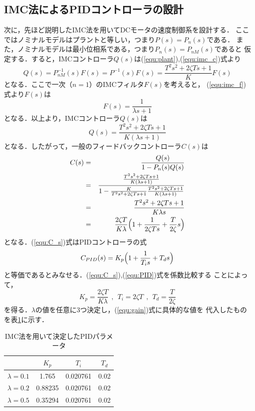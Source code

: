\documentclass[a4paper,12pt]{jarticle}
\begin{document}
\subsection{IMC法によるPIDコントローラの設計}
次に，先ほど説明したIMC法を用いてDCモータの速度制御系を設計する．
ここではノミナルモデルはプラントと等しい，つまり$P(s)=P_{n}(s)$である．
また，ノミナルモデルは最小位相系である，つまり$P_n(s)=P_{nM}(s)$であると
仮定する．すると，IMCコントローラ$Q(s)$は(\ref{equ:plant}),(\ref{equ:imc_c})式より
%
\begin{equation}
 Q(s) = P_{nM}^{-1}(s)F(s) = P^{-1}(s)F(s) = \frac{T^2s^2+2\zeta Ts+1}{K}F(s) 
\end{equation}
%
となる．ここで一次（$n=1$）のIMCフィルタ$F(s)$を考えると，
(\ref{equ:imc_f})式より$F(s)$は
%
\begin{equation}
 F(s) = \frac{1}{\lambda s + 1}
\end{equation}
%
となる．以上より，IMCコントローラ$Q(s)$は
%
\begin{equation}
 Q(s) = \frac{T^2s^2+2\zeta Ts+1}{K(\lambda s + 1)}
\end{equation}
%
となる．したがって，一般のフィードバックコントローラ$C(s)$は
%
\begin{eqnarray}\label{equ:C_s}
 C(s) & = & \frac{Q(s)}{1 - P_n(s)Q(s)} \nonumber  \\ 
  & = & \frac{\frac{T^2s^2+2\zeta Ts+1}{K(\lambda s +
  1)}}{1-\frac{K}{T^2s^2+2\zeta Ts+1}\frac{T^2s^2+2\zeta Ts+1}{K(\lambda
  s + 1)}} \nonumber \\ 
 & = & \frac{T^2s^2+2\zeta Ts+1}{K\lambda s} \nonumber  \\
  & = & \frac{2\zeta T}{K\lambda}\Bigl(1+\frac{1}{2\zeta Ts}+\frac{T}{2\zeta}s\Bigr)
\end{eqnarray}
%
となる．(\ref{equ:C_s})式はPIDコントローラの式
%
\begin{equation}\label{equ:PID}
 C_{PID} (s) = K_p \Bigl(1+\frac{1}{T_i s} + T_d s\Bigr)
\end{equation}
%
と等価であるとみなせる．(\ref{equ:C_s}),(\ref{equ:PID})式を係数比較する
ことによって，
%
\begin{equation}\label{equ:gain}
 K_p =  \frac{2\zeta T}{K\lambda}  \ \  ,  \ \ T_i = 2\zeta T  \ \  , \ \ T_d = \frac{T}{2\zeta}
\end{equation}
%
を得る．$\lambda$の値を任意に3つ決定し，(\ref{equ:gain})式に具体的な値を
代入したものを表\ref{tab:IMC_para}に示す．
%
\begin{table}[tb]
 \centering
 \caption{IMC法を用いて決定したPIDパラメータ}
 \label{tab:IMC_para}
  \begin{tabular}{c||c|c|c}\hline
       \        &$K_p$  &$T_i$   &$T_d$\\\hline
   $\lambda=0.1$&1.765  &0.020761&0.02\\\hline
   $\lambda=0.2$&0.88235&0.020761&0.02\\\hline
   $\lambda=0.5$&0.35294&0.020761&0.02\\\hline
 \end{tabular}
\end{table}
%
\end{document}
